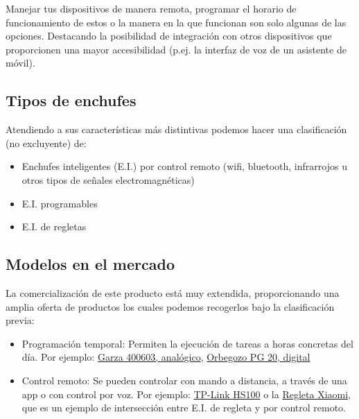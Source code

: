\documentclass[a4paper,10pt]{article}
\begin{document}
Manejar tus dispositivos de manera remota, programar el horario de
funcionamiento de estos o la manera en la que funcionan son solo algunas
de las opciones. Destacando la posibilidad de integración con otros
dispositivos que proporcionen una mayor accesibilidad (p.ej. la interfaz
de voz de un asistente de móvil).

\subsection{Tipos de enchufes}\label{tipos-de-enchufes}

Atendiendo a sus características más distintivas podemos hacer una
clasificación (no excluyente) de:

\begin{itemize}
\item
  Enchufes inteligentes (E.I.) por control remoto (wifi, bluetooth,
  infrarrojos u otros tipos de señales electromagnéticas)
\item
  E.I. programables
\item
  E.I. de regletas
\end{itemize}

\subsection{Modelos en el mercado}\label{modelos-en-el-mercado}

La comercialización de este producto está muy extendida, proporcionando
una amplia oferta de productos los cuales podemos recogerlos bajo la
clasificación previa:

\begin{itemize}
\item
  Programación temporal: Permiten la ejecución de tareas a horas
  concretas del día. Por ejemplo:
  \href{https://web.archive.org/web/20191111121153/https://www.amazon.es/Garza-Power-Temporizador-anal\%C3\%B3gico-programaci\%C3\%B3n/dp/B00URUVDW2/}{Garza
  400603, analógico},
  \href{https://web.archive.org/web/20191112121450/https://www.amazon.es/dp/B00ZJ1LQDK}{Orbegozo
  PG 20, digital}
\item
  Control remoto: Se pueden controlar con mando a distancia, a través de
  una app o con control por voz. Por ejemplo:
  \href{https://web.archive.org/web/20191112130933/https://www.amazon.es/dp/B06W586CDZ}{TP-Link
  HS100} o la
  \href{https://web.archive.org/web/20191116174434/https://www.amazon.es/dp/B07DJ2G1CW}{Regleta
  Xiaomi}, que es un ejemplo de intersección entre E.I. de regleta y por
  control remoto.
\end{itemize}
\end{document}
